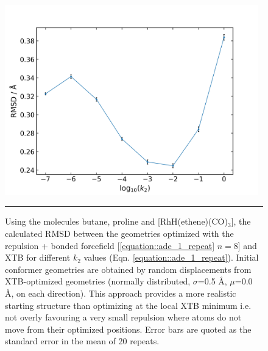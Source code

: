 \documentclass[../../main.tex]{subfiles}
\begin{document}
\begin{figure}[h!]
	\vspace{0.4cm}
	\centering
	\includegraphics[width=11cm]{5/autode/figs/figS3}
	\vspace{0.4cm}
	\hrule
	\caption{Using the molecules butane, proline and [RhH(ethene)(CO)${}_3$], the calculated RMSD between the geometries optimized with the repulsion + bonded forcefield [\eqref{equation::ade_1_repeat} $n=8$] and XTB for different $k_2$ values (Eqn. \eqref{equation::ade_1_repeat}). Initial conformer geometries are obtained by random displacements from XTB-optimized geometries (normally distributed, $\sigma$=0.5 \AA, $\mu$=0.0 \AA, on each direction). This approach provides a more realistic starting structure than optimizing at the local XTB minimum i.e. not overly favouring a very small repulsion where atoms do not move from their optimized positions. Error bars are quoted as the standard error in the mean of 20 repeats.}
	\label{fig::ade_si_3}
\end{figure}
\end{document}
